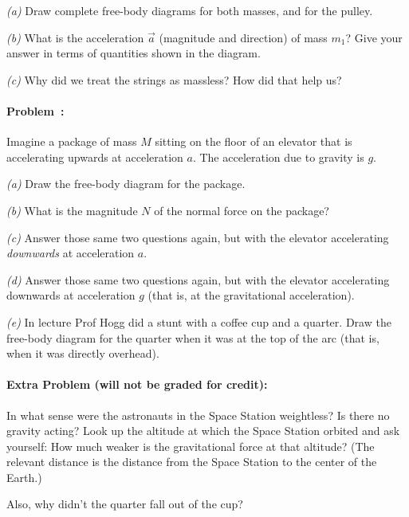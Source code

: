 \documentclass[12pt]{article}
\begin{document}
\textsl{(a)} Draw complete free-body diagrams for both masses, and for
the pulley.

\textsl{(b)} What is the acceleration $\vec{a}$ (magnitude and
direction) of mass $m_1$?  Give your answer in terms of quantities
shown in the diagram.

\textsl{(c)} Why did we treat the strings as massless? How did that
help us?

\paragraph{Problem~\theproblem:}%
Imagine a package of mass $M$ sitting on the floor of an elevator that
is accelerating upwards at acceleration $a$. The acceleration due to
gravity is $g$.

\textsl{(a)} Draw the free-body diagram for the package.

\textsl{(b)} What is the magnitude $N$ of the normal force on the
package?

\textsl{(c)} Answer those same two questions again, but with the
elevator accelerating \emph{downwards} at acceleration $a$.

\textsl{(d)} Answer those same two questions again, but with the
elevator accelerating downwards at acceleration $g$ (that is, at
the gravitational acceleration).

\textsl{(e)} In lecture Prof Hogg did a stunt with a coffee cup and a
quarter. Draw the free-body diagram for the quarter when it was at the
top of the arc (that is, when it was directly overhead).

\paragraph{Extra Problem (will not be graded for credit):}%
In what sense were the astronauts in the Space Station weightless? Is
there no gravity acting? Look up the altitude at which the Space
Station orbited and ask yourself: How much weaker is the gravitational
force at that altitude? (The relevant distance is the distance from
the Space Station to the center of the Earth.)

Also, why didn't the quarter fall out of the cup?
\end{document}
